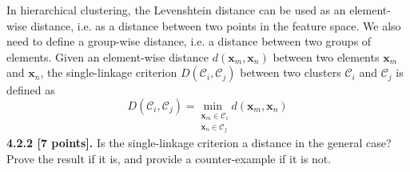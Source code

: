 \documentclass{article}
\begin{document}
In hierarchical clustering, the Levenshtein distance can be used as an element-wise distance, i.e. as a distance between two points in the feature space. We also need to define a group-wise distance, i.e. a distance between two groups of elements. Given an element-wise distance $d(\mathbf{x}_m,\mathbf{x}_n)$ between two elements $\mathbf{x}_m$ and $\mathbf{x}_n$, the single-linkage criterion $D(\mathcal{C}_i,\mathcal{C}_j)$ between two clusters $\mathcal{C}_i$ and $\mathcal{C}_j$ is defined as
\begin{equation}
D(\mathcal{C}_i, \mathcal{C}_j) =
\underset{\substack{\mathbf{x}_m \in \mathcal{C}_i \\ \mathbf{x}_n \in \mathcal{C}_j}}{\text{min }} d(\mathbf{x}_m,\mathbf{x}_n)
\end{equation}
\noindent\textbf{4.2.2 [7 points].} Is the single-linkage criterion a distance in the general case? Prove the result if it is, and provide a counter-example if it is not.
\end{document}
